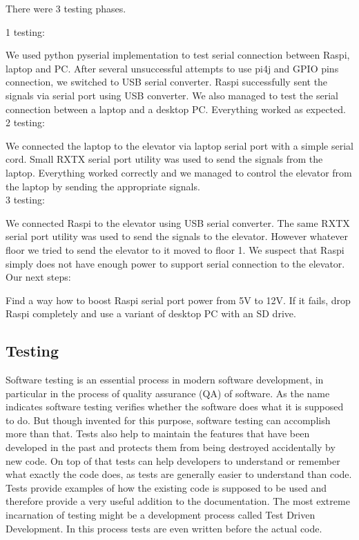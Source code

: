 \documentclass[a4paper, 12pt]{article}
\begin{document}
There were 3 testing phases.

1 testing:

We used python pyserial implementation to test serial connection between Raspi, laptop and PC.
After several unsuccessful attempts to use pi4j and GPIO pins connection, we switched to USB serial converter.
Raspi successfully sent the signals via serial port using USB converter.
We also managed to test the serial connection between a laptop and a desktop PC.
Everything worked as expected.
\\

2 testing:

We connected the laptop to the elevator via laptop serial port with a simple serial cord.
Small RXTX serial port utility was used to send the signals from the laptop.
Everything worked correctly and we managed to control the elevator from the laptop by sending the appropriate signals.
\\

3 testing:

We connected Raspi to the elevator using USB serial converter.
The same RXTX serial port utility was used to send the signals to the elevator.
However whatever floor we tried to send the elevator to it moved to floor 1. 
We suspect that Raspi simply does not have enough power to support serial connection to the elevator.
\\

Our next steps:

Find a way how to boost Raspi serial port power from 5V to 12V.
If it fails, drop Raspi completely and use a variant of desktop PC with an SD drive.

\subsection{Testing}
Software testing is an essential process in modern software development, in particular in the process of quality assurance (QA) of software.
As the name indicates software testing verifies whether the software does what it is supposed to do.
But though invented for this purpose, software testing can accomplish more than that.
Tests also help to maintain the features that have been developed in the past and protects them from being destroyed accidentally by new code.
On top of that tests can help developers to understand or remember what exactly the code does, as tests are generally easier to understand than code.
Tests provide examples of how the existing code is supposed to be used and therefore provide a very useful addition to the documentation.
The most extreme incarnation of testing might be a development process called Test Driven Development.
In this process tests are even written before the actual code.
\end{document}
